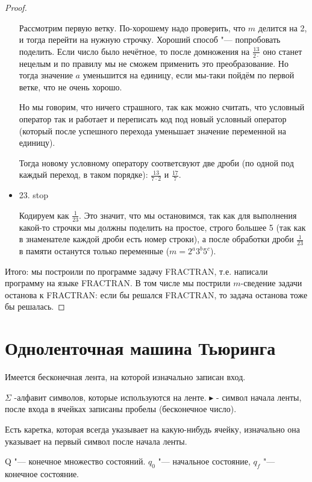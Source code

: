 \begin{proof}
\begin{itemize}
			Рассмотрим первую ветку.
			По-хорошему надо проверить, что $m$ делится на 2, и тогда перейти на нужную строчку.
			Хороший способ "--- попробовать поделить.
			Если число было нечётное, то после домножения на $\frac{13}{2\cdot}$ оно станет нецелым и по правилу мы не сможем применить это преобразование.
			Но тогда значение $a$ уменьшится на единицу, если мы-таки пойдём по первой ветке, что не очень хорошо.

			Но мы говорим, что ничего страшного, так как можно считать, что условный оператор так и работает и переписать код под новый условный оператор
			(который после успешного перехода уменьшает значение переменной на единицу).

			Тогда новому условному оператору соответсвуют две дроби (по одной под каждый переход, в таком порядке):
			$\frac{13}{7\cdot2}$ и $\frac{17}{7}$.
		\item 
\begin{abstractcode}
23. stop
\end{abstractcode}
			Кодируем как $\frac{1}{23}$.
			Это значит, что мы остановимся, так как для выполнения какой-то строчки мы должны поделить на простое,
			строго большее 5 (так как в знаменателе каждой дроби есть номер строки), а после обработки дроби $\frac{1}{23}$ в памяти останутся только переменные ($m = 2^a3^b5^c$).
	\end{itemize}

	Итого: мы построили по программе задачу FRACTRAN, т.е. написали программу на языке FRACTRAN.
	В том числе мы пострили $m$-сведение задачи останова к FRAСTRAN: если бы решался FRACTRAN, то задача останова тоже бы решалась.
\end{proof}

\section{Одноленточная машина Тьюринга}
Имеется бесконечная лента, на которой изначально записан вход.


$\Sigma$ -алфавит символов, которые используются на ленте.
$\blacktriangleright$ - символ начала ленты, после входа в ячейках записаны пробелы (бесконечное число).

Есть каретка, которая всегда указывает на какую-нибудь ячейку, изначально она указывает на первый символ после начала ленты.

Q "--- конечное множество состояний.
$q_0$ "--- начальное состояние, $q_f$ "--- конечное состояние.

